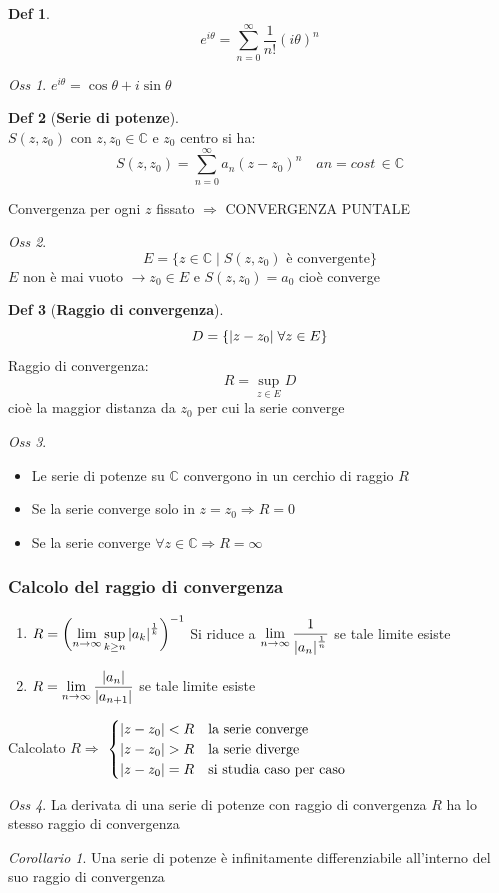 \documentclass[a4paper,11pt]{report}
\theoremstyle{remark}
\newtheorem*{oss}{Oss}
\newtheorem*{coro}{Corollario}
\theoremstyle{definition}
\newtheorem*{Def}{Def}
\newcommand{\C}{\mathbb{C}}
\DeclarePairedDelimiter{\abs}{\lvert}{\rvert}
\begin{document}
\begin{Def}
	\[e^{i\theta} = \sum_{n=0}^{\infty} \frac{1}{n!} {(i\theta)}^n\]
\end{Def}
\begin{oss}
	$e^{i\theta} = \cos\theta + i\sin\theta$
\end{oss}
\begin{Def}[\textbf{Serie di potenze}]\hfil\\
	$S(z,z_0)$ con $z,z_0 \in \C \text{ e } z_0$ centro si ha:
	\[S(z,z_0) = \sum_{n=0}^{\infty} a_n {(z-z_0)}^n \quad an=cost \, \in \C\]
\end{Def}
\noindent Convergenza per ogni $z$ fissato $\Rightarrow$ 	CONVERGENZA PUNTALE
\begin{oss}
	\[E = \{z \in \C \; | \; S(z,z_0) \text{ è convergente}\}\]
	$E$ non è mai vuoto $\rightarrow z_0 \in E$ e $S(z,z_0) = a_0$ cioè converge 
\end{oss}
\begin{Def}[\textbf{Raggio di convergenza}] \label{def:raggio conv} 
	\[D = \{\abs{z-z_0} \; \forall z \in E\}\]
	Raggio di convergenza:
	\[R = \sup_{z \in E} D\]
	cioè la maggior distanza da $z_0$ per cui la serie converge
\end{Def}
\begin{oss}\hfil
	\begin{itemize}
		\item Le serie di potenze su $\C$ convergono in un cerchio di raggio $R$
		\item Se la serie converge solo in $z=z_0 \Rightarrow R=0$
		\item Se la serie converge $\forall z \in \C \Rightarrow R=\infty$
	\end{itemize}
\end{oss}
\subsubsection*{Calcolo del raggio di convergenza}
\begin{enumerate}
	\item $ \displaystyle R = {\left(\lim_{n \to \infty} \sup_{k \geq n} {\abs{a_k}}^\frac{1}{k}\right) }^{-1}$ \newline
	Si riduce a $\displaystyle \lim_{n \to \infty} \frac{1}{{\abs{a_n}}^{\frac{1}{n}}}$ se tale limite esiste
	\item  $\displaystyle R =\lim_{n \to \infty} \frac{\abs{a_n}}{\abs{a_{n+1}}}$ se tale limite esiste 
\end{enumerate}
\noindent Calcolato $R \Rightarrow$ 
$\begin{cases}
	\abs{z-z_0}<R & \text{la serie converge} \\
	\abs{z-z_0}>R & \text{la serie diverge} \\
	\abs{z-z_0}=R & \text{si studia caso per caso}
\end{cases}$
\begin{oss}
	La derivata di una serie di potenze con raggio di convergenza $R$ ha lo stesso raggio di convergenza
\end{oss}
\begin{coro}
	Una serie di potenze è infinitamente differenziabile all'interno del suo raggio di convergenza
\end{coro}
\end{document}
